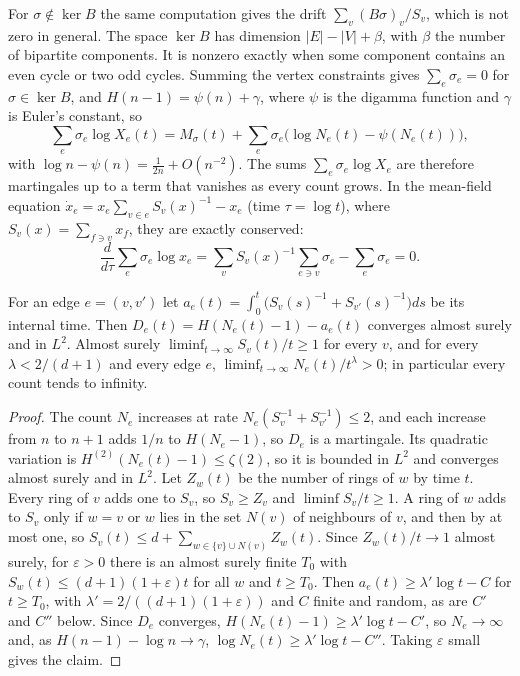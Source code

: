 \documentclass[11pt]{amsart}
\theoremstyle{remark}\newtheorem{remark}[theorem]{Remark}
\begin{document}
For $\sigma\notin\ker B$ the same computation gives the drift $\sum_v(B\sigma)_v/S_v$, which is not zero in general.
The space $\ker B$ has dimension $|E|-|V|+\beta$, with $\beta$ the number of bipartite components. It is nonzero exactly
when some component contains an even cycle or two odd cycles. Summing the vertex constraints gives $\sum_e\sigma_e=0$
for $\sigma\in\ker B$, and $H(n-1)=\psi(n)+\gamma$, where $\psi$ is the digamma function and $\gamma$ is Euler's constant, so
\begin{equation}\label{eq:link}
\sum_e\sigma_e\log X_e(t)=M_\sigma(t)+\sum_e\sigma_e\bigl(\log N_e(t)-\psi(N_e(t))\bigr),
\end{equation}
with $\log n-\psi(n)=\tfrac1{2n}+O(n^{-2})$. The sums $\sum_e\sigma_e\log X_e$ are therefore martingales up to a term
that vanishes as every count grows. In the mean-field equation $\dot x_e=x_e\sum_{v\in e}S_v(x)^{-1}-x_e$ (time
$\tau=\log t$), where $S_v(x)=\sum_{f\ni v}x_f$, they are exactly conserved:
\[ \frac{d}{d\tau}\sum_e\sigma_e\log x_e=\sum_v S_v(x)^{-1}\sum_{e\ni v}\sigma_e-\sum_e\sigma_e=0. \]

\begin{lemma}\label{lem:growth}
For an edge $e=(v,v')$ let $a_e(t)=\int_0^t\bigl(S_v(s)^{-1}+S_{v'}(s)^{-1}\bigr)ds$ be its internal time. Then
$D_e(t)=H(N_e(t)-1)-a_e(t)$ converges almost surely and in $L^2$. Almost surely
$\liminf_{t\to\infty}S_v(t)/t\ge1$ for every $v$, and for every $\lambda<2/(d+1)$ and every edge $e$,
$\liminf_{t\to\infty}N_e(t)/t^{\lambda}>0$; in particular every count tends to infinity.
\end{lemma}
\begin{proof}
The count $N_e$ increases at rate $N_e(S_v^{-1}+S_{v'}^{-1})\le2$, and each increase from $n$ to $n+1$ adds $1/n$ to
$H(N_e-1)$, so $D_e$ is a martingale. Its quadratic variation is $H^{(2)}(N_e(t)-1)\le\zeta(2)$, so it is bounded in
$L^2$ and converges almost surely and in $L^2$. Let $Z_w(t)$ be the number of rings of $w$ by time $t$. Every ring of
$v$ adds one to $S_v$, so $S_v\ge Z_v$ and $\liminf S_v/t\ge1$. A ring of $w$ adds to $S_v$ only if $w=v$ or $w$ lies in the set $N(v)$ of
neighbours of $v$, and then by at most one, so $S_v(t)\le d+\sum_{w\in\{v\}\cup N(v)}Z_w(t)$. Since $Z_w(t)/t\to1$ almost surely, for $\varepsilon>0$
there is an almost surely finite $T_0$ with $S_w(t)\le(d+1)(1+\varepsilon)t$ for all $w$ and $t\ge T_0$. Then
$a_e(t)\ge\lambda'\log t-C$ for $t\ge T_0$, with $\lambda'=2/((d+1)(1+\varepsilon))$ and $C$ finite and random,
as are $C'$ and $C''$ below. Since $D_e$
converges, $H(N_e(t)-1)\ge\lambda'\log t-C'$, so $N_e\to\infty$ and, as $H(n-1)-\log n\to\gamma$,
$\log N_e(t)\ge\lambda'\log t-C''$. Taking $\varepsilon$ small gives the claim.
\end{proof}
\end{document}
